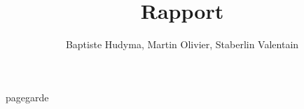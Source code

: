 \documentclass[a4paper, 12pt, titlepage, oneside, french]{article}
\author{Baptiste Hudyma, Martin Olivier, Staberlin Valentain}
\title{Rapport}
\begin{document}
{pagegarde}
\newpage


\tableofcontents
\end{document}
